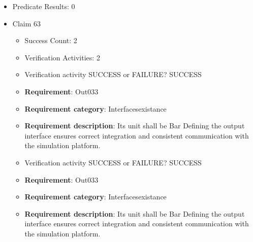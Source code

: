 \documentclass{article}
\begin{document}
\begin{itemize}
\begin{itemize}
						\item \textbf{Requirement}: Out032 
						\item \textbf{Requirement category}: Interfacesexistance 
						\item \textbf{Requirement description}: Its unit shall be Bar Defining the output interface ensures correct integration and consistent communication with the simulation platform.
					
					\item Verification activity SUCCESS or FAILURE? SUCCESS
		
						\item \textbf{Requirement}: Out032 
						\item \textbf{Requirement category}: Interfacesexistance 
						\item \textbf{Requirement description}: Its unit shall be Bar Defining the output interface ensures correct integration and consistent communication with the simulation platform.
					
				\end{itemize}
				
									    
				\item Predicate Results: 0

  				  \item Claim 63
				\begin{itemize}
			    	\item Success Count: 2 
			    	\item Verification Activities: 2
					\item Verification activity SUCCESS or FAILURE? SUCCESS
		
						\item \textbf{Requirement}: Out033 
						\item \textbf{Requirement category}: Interfacesexistance 
						\item \textbf{Requirement description}: Its unit shall be Bar Defining the output interface ensures correct integration and consistent communication with the simulation platform.
					
					\item Verification activity SUCCESS or FAILURE? SUCCESS
		
						\item \textbf{Requirement}: Out033 
						\item \textbf{Requirement category}: Interfacesexistance 
						\item \textbf{Requirement description}: Its unit shall be Bar Defining the output interface ensures correct integration and consistent communication with the simulation platform.
					

\end{itemize}
\end{itemize}
\end{document}
